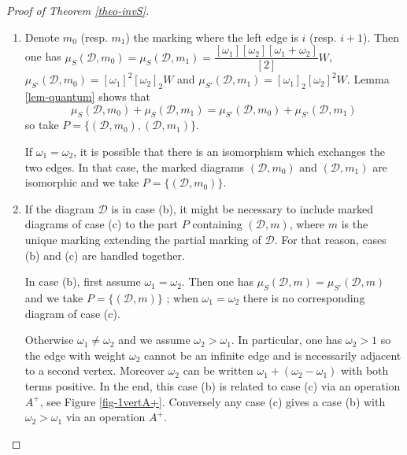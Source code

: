 \documentclass[11pt]{article}
\theoremstyle{definition}
\numberwithin{equation}{section}
\newcommand{\floor}{\node[draw,ellipse, minimum width=1cm, minimum height = 0.6 cm]}
\newcommand{\D}{\mathcal{D}}
\newcommand{\muSDm}{\mu_S(\D,m)}
\newcommand{\muSSDm}{\mu_{S'}(\D,m)}
\newcommand{\muSDmk}{\mu_S(\D,m_0)}
\newcommand{\muSDmkk}{\mu_S(\D,m_1)}
\newcommand{\muSSDmk}{\mu_{S'}(\D,m_0)}
\newcommand{\muSSDmkk}{\mu_{S'}(\D,m_1)}
\theoremstyle{plain}
\begin{document}
\begin{proof}[Proof of Theorem \ref{theo-invS}]
\begin{enumerate}[label=(\alph*)]
\item Denote $m_0$ (resp. $m_1$) the marking where the left edge is $i$ (resp. $i+1$). Then one has $\muSDmk = \muSDmkk = \dfrac{[\omega_1][\omega_2][\omega_1+\omega_2]}{[2]} W$, $\muSSDmk = [\omega_1]^2 [\omega_2]_2 W$ and $\muSSDmkk = [\omega_1]_2 [\omega_2]^2 W$. Lemma \ref{lem-quantum} shows that 
\[ \muSDmk + \muSDmkk = \muSSDmk + \muSSDmkk  \]
so take $P = \{(\D,m_0), (\D,m_1)\}$.

If $\omega_1=\omega_2$, it is possible that there is an isomorphism which exchanges the two edges. In that case, the marked diagrams $(\D,m_0)$ and $(\D,m_1)$ are isomorphic and we take $P = \{(\D,m_0)\}$.


\item[(b,c)] If the diagram $\D$ is in case (b), it might be necessary to include marked diagrams of case (c) to the part $P$ containing $(\D,m)$, where $m$ is the unique marking extending the partial marking of $\D$. For that reason, cases (b) and (c) are handled together.

In case (b), first assume $\omega_1=\omega_2$. Then one has $\muSDm = \muSSDm$ and we take $P=\{(\D,m)\}$ ; when $\omega_1 = \omega_2$ there is no corresponding diagram of case (c).

Otherwise $\omega_1 \neq \omega_2$ and we assume $\omega_2 > \omega_1$. In particular, one has $\omega_2>1$ so the edge with weight $\omega_2$ cannot be an infinite edge and is necessarily adjacent to a second vertex. Moreover $\omega_2$ can be written $\omega_1 + (\omega_2-\omega_1)$ with both terms positive. In the end, this case (b) is related to case (c) via an operation $A^+$, see Figure \ref{fig-1vertA+}. 
Conversely any case (c) gives a case (b) with $\omega_2 > \omega_1$ via an operation $A^+$.

\begin{figure}[h]
	\centering
{}
\end{figure}
\end{enumerate}
\end{proof}
\end{document}
